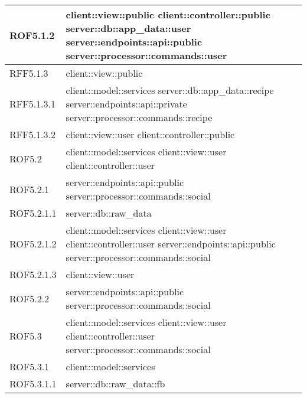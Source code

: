 \begin{center}
\begin{longtable}{| p{4cm} | p{8cm} |}
\hline
ROF5.1.2 & client::view::public \newline client::controller::public \newline server::db::app\_data::user \newline server::endpoints::api::public \newline server::processor::commands::user \\
\hline
RFF5.1.3 & client::view::public \\
\hline
RFF5.1.3.1 & client::model::services \newline server::db::app\_data::recipe \newline server::endpoints::api::private \newline server::processor::commands::recipe \\
\hline
RFF5.1.3.2 & client::view::user \newline client::controller::public \\
\hline
ROF5.2 & client::model::services \newline client::view::user \newline client::controller::user \\
\hline
ROF5.2.1 & server::endpoints::api::public \newline server::processor::commands::social \\
\hline
ROF5.2.1.1 & server::db::raw\_data \\
\hline
ROF5.2.1.2 & client::model::services \newline client::view::user \newline client::controller::user \newline server::endpoints::api::public \newline server::processor::commands::social \\
\hline
ROF5.2.1.3 & client::view::user \\
\hline
ROF5.2.2 & server::endpoints::api::public \newline server::processor::commands::social \\
\hline
ROF5.3 & client::model::services \newline client::view::user \newline client::controller::user \newline server::processor::commands::social \\
\hline
ROF5.3.1 & client::model::services \\
\hline
ROF5.3.1.1 & server::db::raw\_data::fb \\
\hline

\end{longtable}
\end{center}
